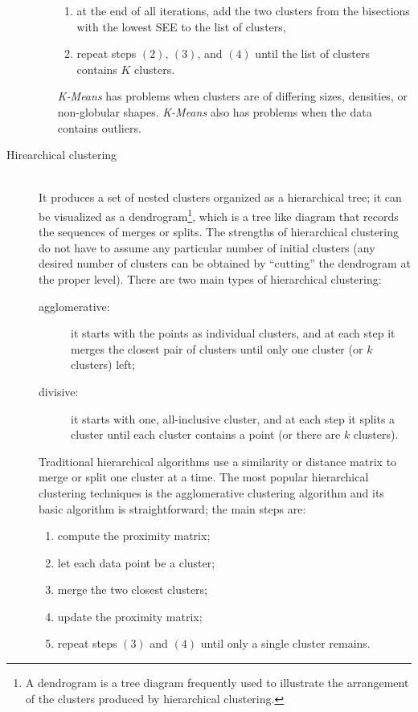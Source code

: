 \begin{description}
\begin{itemize}
\begin{enumerate}
			\item
			at the end of all iterations, add the two clusters from the bisections with the lowest SEE to the list of clusters,
			\item
			repeat steps $(2)$, $(3)$, and $(4)$ until the list of clusters contains $K$ clusters.
		\end{enumerate}
		\emph{K-Means} has problems when clusters are of differing sizes, densities, or non-globular shapes.
		\emph{K-Means} also has problems when the data contains outliers.
	\end{itemize}
	\item[Hirearchical clustering] \hfill \\
	It produces a set of nested clusters organized as a hierarchical tree; it can be visualized as a dendrogram\footnote{A dendrogram is a tree diagram frequently used to illustrate the arrangement of the clusters produced by hierarchical clustering.}, which is a tree like diagram that records the sequences of merges or splits.
	The strengths of hierarchical clustering do not have to assume any particular number of initial clusters (any desired number of clusters can be obtained by ``cutting'' the dendrogram at the proper level).
	There are two main types of hierarchical clustering:
	\begin{description}
		\item[agglomerative:] it starts with the points as individual clusters, and at each step it merges the closest pair of clusters until only one cluster (or $k$ clusters) left;
		\item[divisive:] it starts with one, all-inclusive cluster, and at each step it splits a cluster until each cluster contains a point (or there are $k$ clusters).
	\end{description}
	Traditional hierarchical algorithms use a similarity or distance matrix to merge or split one cluster at a time.
	The most popular hierarchical clustering techniques is the agglomerative clustering algorithm and its basic algorithm is straightforward; the main steps are:
	\begin{enumerate}
		\item
		compute the proximity matrix;
		\item
		let each data point be a cluster;
		\item
		merge the two closest clusters;
		\item
		update the proximity matrix;
		\item
		repeat steps $(3)$ and $(4)$ until only a single cluster remains.

\end{enumerate}
\end{description}
